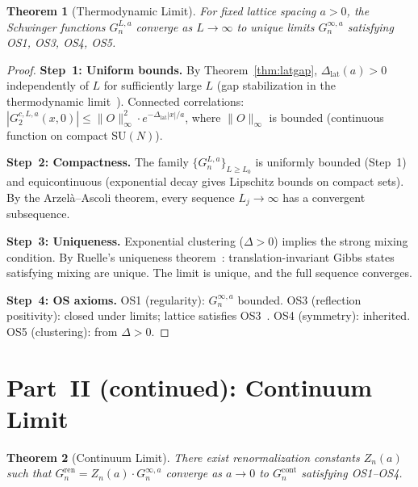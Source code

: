 \documentclass[12pt,a4paper]{article}
\theoremstyle{plain}
\newtheorem{theorem}{Theorem}[section]
\theoremstyle{definition}
\theoremstyle{remark}
\begin{document}
\begin{theorem}[Thermodynamic Limit]\label{thm:thermo}
For fixed lattice spacing $a>0$, the Schwinger functions $G_n^{L,a}$ converge as $L\to\infty$ to unique limits $G_n^{\infty,a}$ satisfying OS1, OS3, OS4, OS5.
\end{theorem}

\begin{proof}
\textbf{Step~1: Uniform bounds.} By Theorem~\ref{thm:latgap}, $\Delta_{\mathrm{lat}}(a)>0$ independently of $L$ for sufficiently large $L$ (gap stabilization in the thermodynamic limit~\cite{Ruelle1969}). Connected correlations:
$|G_2^{c,L,a}(x,0)| \leq \|O\|_\infty^2\cdot e^{-\Delta_{\mathrm{lat}}|x|/a}$,
where $\|O\|_\infty$ is bounded (continuous function on compact $\mathrm{SU}(N)$).

\textbf{Step~2: Compactness.} The family $\{G_n^{L,a}\}_{L\geq L_0}$ is uniformly bounded (Step~1) and equicontinuous (exponential decay gives Lipschitz bounds on compact sets). By the Arzel\`a--Ascoli theorem, every sequence $L_j\to\infty$ has a convergent subsequence.

\textbf{Step~3: Uniqueness.} Exponential clustering ($\Delta>0$) implies the strong mixing condition. By Ruelle's uniqueness theorem~\cite{Ruelle1969}: translation-invariant Gibbs states satisfying mixing are unique. The limit is unique, and the full sequence converges.

\textbf{Step~4: OS axioms.} OS1 (regularity): $G_n^{\infty,a}$ bounded. OS3 (reflection positivity): closed under limits; lattice satisfies OS3~\cite{OsterwalderSeiler1978}. OS4 (symmetry): inherited. OS5 (clustering): from $\Delta>0$.
\end{proof}

\section{Part~II (continued): Continuum Limit}\label{sec:contlim}

\begin{theorem}[Continuum Limit]\label{thm:cont}
There exist renormalization constants $Z_n(a)$ such that $G_n^{\mathrm{ren}}=Z_n(a)\cdot G_n^{\infty,a}$ converge as $a\to 0$ to $G_n^{\mathrm{cont}}$ satisfying OS1--OS4.
\end{theorem}
\end{document}
